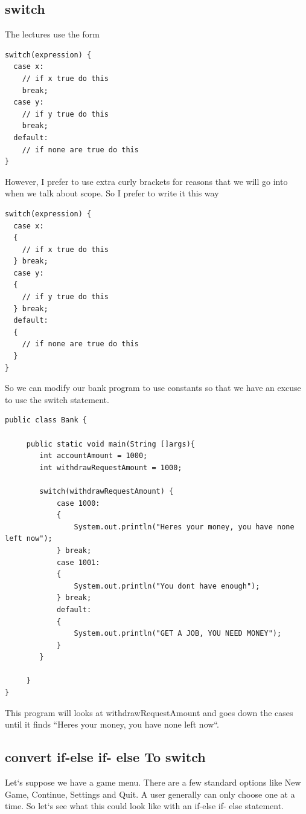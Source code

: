 \documentclass[11]{article}
\begin{document}
\subsection{switch}
The lectures use the form
\begin{lstlisting}
switch(expression) {
  case x:
    // if x true do this
    break;
  case y:
    // if y true do this
    break;
  default:
    // if none are true do this
}
\end{lstlisting}

However, I prefer to use extra curly brackets for reasons that we will go into when we talk about scope. So I prefer to write it this way

\begin{lstlisting}
switch(expression) {
  case x:
  {
    // if x true do this
  } break;
  case y:
  {
    // if y true do this
  } break;
  default:
  {
    // if none are true do this
  }
}
\end{lstlisting}

So we can modify our bank program to use constants so that we have an excuse to use the switch statement.

\begin{lstlisting}
public class Bank {

     public static void main(String []args){
        int accountAmount = 1000;
        int withdrawRequestAmount = 1000;
        
        switch(withdrawRequestAmount) {
            case 1000:
            {
                System.out.println("Heres your money, you have none left now");
            } break;
            case 1001:
            {
                System.out.println("You dont have enough");
            } break;
            default:
            {
                System.out.println("GET A JOB, YOU NEED MONEY");
            }
        }
        
     }
}
\end{lstlisting}

This program will looks at withdrawRequestAmount and goes down the cases until it finds ``Heres your money, you have none left now``. 

\subsection{convert if-else if- else To switch}
Let`s suppose we have a game menu. There are a few standard options like New Game, Continue, Settings and Quit. A user generally can only choose one at a time. So let`s see what this could look like with an if-else if- else statement.
\end{document}
